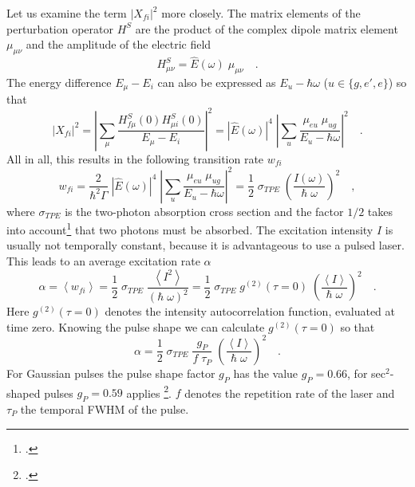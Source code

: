 Let us examine the term $|X_{fi}|^2$  more closely. The
matrix elements of the perturbation operator $H^S$ are the product of the
complex dipole matrix element $\mu_{\mu \nu}$ and the amplitude of the electric field
\begin{equation}
  H^S_{\mu \nu} = \hat{E}(\omega) \; \mu_{\mu \nu} \quad .
\end{equation}
The energy difference $E_\mu - E_i$ can also be expressed as $E_u - \hbar
\omega$ ($u \in \{g, e', e \}$) so that
\begin{equation}
|X_{fi}|^2 = \left| \sum_{\mu} \frac{H^S_{f \mu} (0) H^S_{\mu i}
(0)}{E_{\mu} - E_i} \right|^2 = \left| \hat{E}(\omega) \right|^4
\;  \left| \sum_{u} \frac{\mu_{e u} \; \mu_{u g}}{E_{u} - \hbar
\omega} \right|^2 \quad .
\end{equation}
All in all, this results in the following transition rate $w_{fi}$ 
\begin{equation}
w_{fi} =  \frac{2}{\hbar^2 \Gamma} \; \left| \hat{E}(\omega) \right|^4  \; \left|
\sum_{u} \frac{\mu_{e u} \; \mu_{u g}}{E_{u} - \hbar \omega}
\right|^2 = \frac{1}{2} \; \sigma_{TPE} \;
\left(\frac{I(\omega)}{\hbar \; \omega}\right)^2 \quad ,
\label{gl_theo_nlo_tpe_uebergansgrate}
\end{equation}
where $\sigma_{TPE}$ is the two-photon absorption cross section
and the factor $1/2$ takes into account\footcite{xu97} that two photons
must be absorbed. The
excitation intensity $I$ is  usually not temporally
constant, because it is advantageous to use a pulsed laser. This leads to an average excitation rate $\alpha$
\begin{equation}
  \alpha = \left< w_{fi} \right> =
  \frac{1}{2} \; \sigma_{TPE} \; \frac{ \left<I^2 \right>}{(\hbar \; \omega)^2}
  = \frac{1}{2} \; \sigma_{TPE} \; g^{(2)}(\tau = 0) \;
  \left(\frac{\left< I \right>}{\hbar \; \omega}\right)^2 \quad .
\end{equation}
Here $g^{(2)}(\tau = 0)$ denotes the 
intensity autocorrelation function, evaluated at  time zero. 
Knowing the pulse shape we can calculate 
 $g^{(2)}(\tau
= 0)$ so that
\begin{equation}
  \alpha
  = \frac{1}{2} \; \sigma_{TPE} \; \frac{g_P}{f \; \tau_P} \;
  \left(\frac{\left< I \right>}{\hbar \; \omega}\right)^2 \quad .
\end{equation}
For Gaussian pulses the pulse shape factor $g_P$ has the value
$g_P = 0.66$, for sec$^2$-shaped pulses $g_P = 0.59$ applies
\footcite{xu97}. $f$ denotes the repetition rate of the laser and
$\tau_P$ the temporal FWHM of the pulse. 




